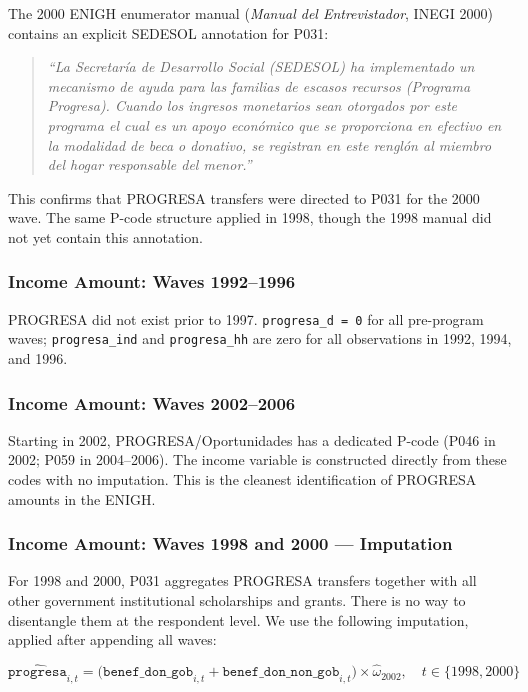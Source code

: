 \noindent
The 2000 ENIGH enumerator manual (\textit{Manual del Entrevistador}, INEGI
2000) contains an explicit SEDESOL annotation for P031:

\begin{quote}
\textit{``La Secretar\'ia de Desarrollo Social (SEDESOL) ha implementado un
mecanismo de ayuda para las familias de escasos recursos (Programa Progresa).
Cuando los ingresos monetarios sean otorgados por este programa el cual es un
apoyo econ\'omico que se proporciona en efectivo en la modalidad de beca o
donativo, se registran en este rengl\'on al miembro del hogar responsable del
menor.''}
\end{quote}

This confirms that PROGRESA transfers were directed to P031 for the 2000 wave.
The same P-code structure applied in 1998, though the 1998 manual did not yet
contain this annotation.

\subsubsection{Income Amount: Waves 1992--1996}

PROGRESA did not exist prior to 1997. \texttt{progresa\_d = 0} for all
pre-program waves; \texttt{progresa\_ind} and \texttt{progresa\_hh} are zero
for all observations in 1992, 1994, and 1996.

\subsubsection{Income Amount: Waves 2002--2006}

Starting in 2002, PROGRESA/Oportunidades has a dedicated P-code (P046 in 2002;
P059 in 2004--2006). The income variable is constructed directly from these
codes with no imputation. This is the cleanest identification of PROGRESA
amounts in the ENIGH.

\subsubsection{Income Amount: Waves 1998 and 2000 --- Imputation}
\label{app:enigh_imputation}

For 1998 and 2000, P031 aggregates PROGRESA transfers together with all other
government institutional scholarships and grants. There is no way to
disentangle them at the respondent level. We use the following imputation,
applied after appending all waves:

\begin{equation}
\widehat{\texttt{progresa}}_{i,t} =
  \bigl(\texttt{benef\_don\_gob}_{i,t}
    + \texttt{benef\_don\_non\_gob}_{i,t}\bigr)
  \times \hat{\omega}_{2002}, \quad t \in \{1998, 2000\}
\label{eq:progresa_share}
\end{equation}

